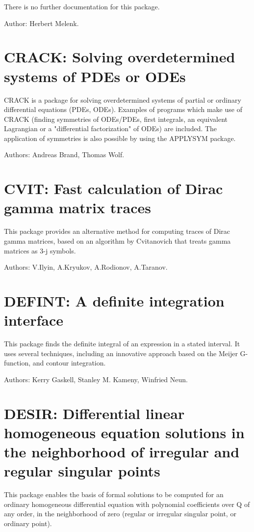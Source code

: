 There is no further documentation for this package.

Author: Herbert Melenk.

\section{CRACK: Solving overdetermined systems of PDEs or ODEs}

CRACK is a package for solving overdetermined systems of partial or
ordinary differential equations (PDEs, ODEs).  Examples of programs which
make use of CRACK (finding symmetries of ODEs/PDEs, first integrals, an
equivalent Lagrangian or a "differential factorization" of ODEs) are
included.  The application of symmetries is also possible by using the
APPLYSYM package.

Authors: Andreas Brand, Thomas Wolf.

\section{CVIT: Fast calculation of Dirac gamma matrix traces}

This package provides an alternative method for computing traces of Dirac
gamma matrices, based on an algorithm by Cvitanovich that treats gamma
matrices as 3-j symbols.

Authors: V.Ilyin, A.Kryukov, A.Rodionov, A.Taranov.

\section{DEFINT: A definite integration interface}

This package finds the definite integral of an expression in a stated
interval.  It uses several techniques, including an innovative approach
based on the Meijer G-function, and contour integration.

Authors: Kerry Gaskell, Stanley M. Kameny, Winfried Neun.

\section{DESIR: Differential linear homogeneous equation solutions in the
              neighborhood of irregular and regular singular points}

This package enables the basis of formal solutions to be computed for an
ordinary homogeneous differential equation with polynomial coefficients
over Q of any order, in the neighborhood of zero (regular or irregular
singular point, or ordinary point).

